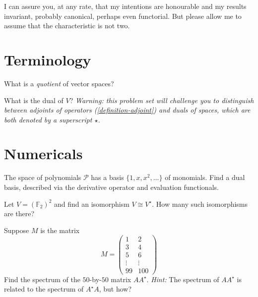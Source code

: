 \documentclass{homework}
\author{Jim Fowler}
\begin{document}
\maketitle

\begin{inspiration}
  I can assure you, at any rate, that my intentions are honourable and
  my results invariant, probably canonical, perhaps even
  functorial. But please allow me to assume that the characteristic is
  not two.
\end{inspiration}

\section{Terminology}

\begin{problem}
  What is a \textit{quotient} of vector spaces?
\end{problem}

\begin{problem}
  What is the dual of $V$?  \textit{Warning: this problem set will
    challenge you to distinguish between adjoints of operators
    (\ref{definition-adjoint}) and duals of spaces, which are both
    denoted by a superscript $\star$.}
\end{problem}

\section{Numericals}

\begin{problem}
  The space of polynomials $\mathcal{P}$ has a basis
  $\{1,x,x^2,\ldots\}$ of monomials.  Find a dual basis, described via
  the derivative operator and evaluation functionals.
\end{problem}

\begin{problem}\label{f2-isomorphism-count}
  Let $V = \left(\mathbb{F}_2\right)^2$ and find an isomorphism
  $V \cong V^\star$.  How many such isomorphisms are there?
\end{problem}

\begin{problem}
  Suppose $M$ is the matrix
  \[
    M = \begin{pmatrix} 1 & 2 \\
      3 & 4 \\
      5 & 6 \\
      \vdots & \vdots \\
      99 & 100
      \end{pmatrix}
    \]
    Find the spectrum of the $50$-by-$50$ matrix $AA^\star$.  \textit{Hint:} The spectrum of $AA^\star$ is related to the spectrum of $A^\star A$, but how?
  \end{problem}
\end{document}
